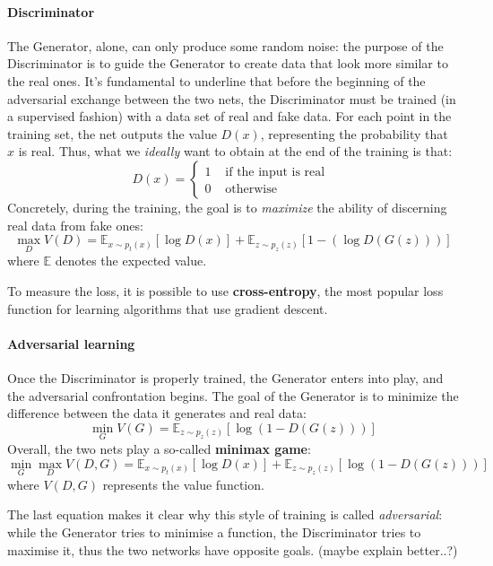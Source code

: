\documentclass[12pt,a4paper]{book}
\theoremstyle{definition}
\begin{document}
	\paragraph{Discriminator}
	The Generator, alone, can only produce some random noise: the purpose of the Discriminator is to guide the Generator to create data that look more similar to the real ones. It's fundamental to underline that before the beginning of the adversarial exchange between the two nets, the Discriminator must be trained (in a supervised fashion) with a data set of real and fake data.
	For each point in the training set, the net outputs the value $D(x)$, representing the probability that $x$ is real. Thus, what we \textit{ideally} want to obtain at the end of the training is that:
	\[
	D(x) = \begin{cases}
		1 &\text{ if the input is real }\\
		0 & \text{ otherwise }
	\end{cases}
	\]
	Concretely, during the training, the goal is to \textit{maximize} the ability of discerning real data from fake ones:
	\[
	\max_D V(D) = \mathbb{E}_{x\sim p_t(x)}[\log D(x)] + \mathbb{E}_{z\sim p_z(z)}[1-(\log D(G(z)))]
	\]
	where $\mathbb{E}$ denotes the expected value.
	
	To measure the loss, it is possible to use \textbf{cross-entropy}, the most popular loss function for learning algorithms that use gradient descent.
	\paragraph{Adversarial learning}
	Once the Discriminator is properly trained, the Generator enters into play, and the adversarial confrontation begins. The goal of the Generator is to minimize the difference between the data it generates and real data:
	\[
	\min_G V(G) = \mathbb{E}_{z\sim p_z(z)}[\log(1-D(G(z)))]
	\]
	Overall, the two nets play a so-called \textbf{minimax game}:
	\[
	\min_G \max_D V(D,G) = \mathbb{E}_{x\sim p_t(x)}[\log D(x)] + \mathbb{E}_{z\sim p_z(z)}[\log (1-D(G(z)))]
	\]
	where $V(D,G)$ represents the value function.
	
	The last equation makes it clear why this style of training is called \textit{adversarial}: while the Generator tries to minimise a function, the Discriminator tries to maximise it, thus the two networks have opposite goals. (maybe explain better..?)
	
\end{document}
